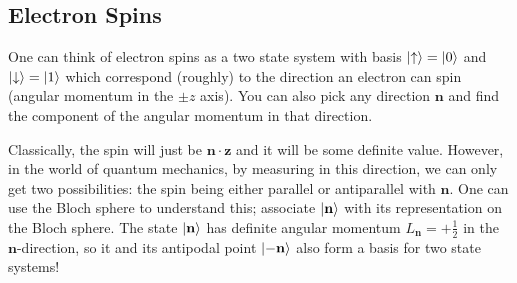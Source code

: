 \subsection{Electron Spins}
One can think of electron spins as a two state system with basis $\ket{\uparrow} = \ket{0}$ and $\ket{\downarrow} = \ket{1}$
which correspond (roughly) to the direction an electron can spin (angular momentum in the $\pm z$ axis). You can also pick any direction $\mathbf{n}$
and find the component of the angular momentum in that direction. 

Classically, the spin will just be $\mathbf{n} \cdot \mathbf{z}$ and it will be some definite value.
However, in the world of quantum mechanics, by measuring in this direction, we can only get two possibilities: the spin being either parallel or antiparallel with $\mathbf{n}$.
One can use the Bloch sphere to understand this; associate $\ket{\mathbf{n}}$ with its representation on the Bloch sphere.
The state $\ket{\mathbf{n}}$ has definite angular momentum $L_{\mathbf{n}} = + \frac{1}{2}$ in the $\mathbf{n}$-direction, so it and its antipodal point $\ket{- \mathbf{n}}$ also form a basis for two state systems!

